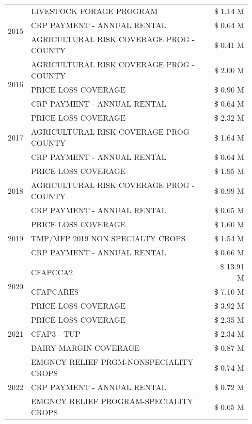 \begin{tabular}{llr}
\cline{1-3}
\multirow[t]{3}{*}{2015} & LIVESTOCK FORAGE PROGRAM & \$ 1.14 M \\
 & CRP PAYMENT - ANNUAL RENTAL & \$ 0.64 M \\
 & AGRICULTURAL RISK COVERAGE PROG - COUNTY & \$ 0.41 M \\
\cline{1-3}
\multirow[t]{3}{*}{2016} & AGRICULTURAL RISK COVERAGE PROG - COUNTY & \$ 2.00 M \\
 & PRICE LOSS COVERAGE & \$ 0.90 M \\
 & CRP PAYMENT - ANNUAL RENTAL & \$ 0.64 M \\
\cline{1-3}
\multirow[t]{3}{*}{2017} & PRICE LOSS COVERAGE & \$ 2.32 M \\
 & AGRICULTURAL RISK COVERAGE PROG - COUNTY & \$ 1.64 M \\
 & CRP PAYMENT - ANNUAL RENTAL & \$ 0.64 M \\
\cline{1-3}
\multirow[t]{3}{*}{2018} & PRICE LOSS COVERAGE & \$ 1.95 M \\
 & AGRICULTURAL RISK COVERAGE PROG - COUNTY & \$ 0.99 M \\
 & CRP PAYMENT - ANNUAL RENTAL & \$ 0.65 M \\
\cline{1-3}
\multirow[t]{3}{*}{2019} & PRICE LOSS COVERAGE & \$ 1.60 M \\
 & TMP/MFP 2019 NON SPECIALTY CROPS & \$ 1.54 M \\
 & CRP PAYMENT - ANNUAL RENTAL & \$ 0.66 M \\
\cline{1-3}
\multirow[t]{3}{*}{2020} & CFAPCCA2 & \$ 13.91 M \\
 & CFAPCARES & \$ 7.10 M \\
 & PRICE LOSS COVERAGE & \$ 3.92 M \\
\cline{1-3}
\multirow[t]{3}{*}{2021} & PRICE LOSS COVERAGE & \$ 2.35 M \\
 & CFAP3 - TUP & \$ 2.34 M \\
 & DAIRY MARGIN COVERAGE & \$ 0.87 M \\
\cline{1-3}
\multirow[t]{3}{*}{2022} & EMGNCY RELIEF PRGM-NONSPECIALITY CROPS & \$ 0.74 M \\
 & CRP PAYMENT - ANNUAL RENTAL & \$ 0.72 M \\
 & EMGNCY RELIEF PROGRAM-SPECIALITY CROPS & \$ 0.65 M \\
\cline{1-3}
\bottomrule
\end{tabular}
